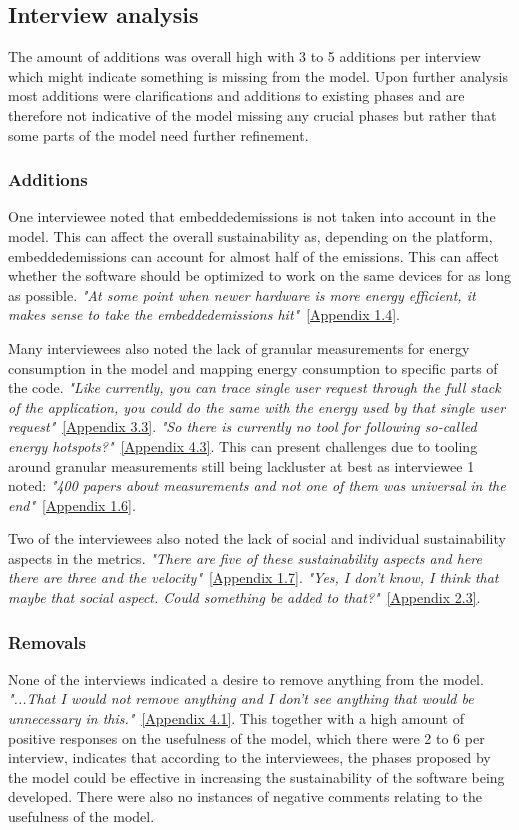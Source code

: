 \subsection{Interview analysis}
The amount of additions was overall high with 3 to 5 additions per interview which might indicate something is missing from the model. Upon further analysis most additions were clarifications and additions to existing phases and are therefore not indicative of the model missing any crucial phases but rather that some parts of the model need further refinement. 

\subsubsection{Additions}
One interviewee noted that \gls{embeddedemissions} is not taken into account in the model. This can affect the overall sustainability as, depending on the platform, \gls{embeddedemissions} can account for almost half of the emissions. This can affect whether the software should be optimized to work on the same devices for as long as possible. \textit{"At some point when newer hardware is more energy efficient, it makes sense to take the \gls{embeddedemissions} hit"}~\hyperref[i14]{[Appendix 1.4]}.

Many interviewees also noted the lack of granular measurements for energy consumption in the model and mapping energy consumption to specific parts of the code. \textit{"Like currently, you can trace single user request through the full stack of the application, you could do the same with the energy used by that single user request"}~\hyperref[i33]{[Appendix 3.3]}. \textit{"So there is currently no tool for following so-called energy hotspots?"}~\hyperref[i43]{[Appendix 4.3]}. This can present challenges due to tooling around granular measurements still being lackluster at best as interviewee 1 noted: \textit{"400 papers about measurements and not one of them was universal in the end"}~\hyperref[i16]{[Appendix 1.6]}.

Two of the interviewees also noted the lack of social and individual sustainability aspects in the metrics. \textit{"There are five of these sustainability aspects and here there are three and the velocity"}~\hyperref[i17]{[Appendix 1.7]}. \textit{"Yes, I don't know, I think that maybe that social aspect. Could something be added to that?"}~\hyperref[i23]{[Appendix 2.3]}.

\subsubsection{Removals}
None of the interviews indicated a desire to remove anything from the model. \textit{"...That I would not remove anything and I don't see anything that would be unnecessary in this."}~\hyperref[i41]{[Appendix 4.1]}. This together with a high amount of positive responses on the usefulness of the model, which there were 2 to 6 per interview, indicates that according to the interviewees, the phases proposed by the model could be effective in increasing the sustainability of the software being developed. There were also no instances of negative comments relating to the usefulness of the model.

